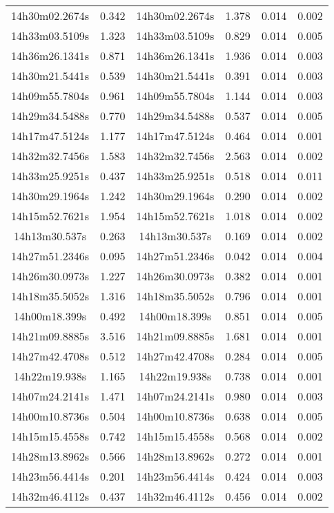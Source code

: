 \begin{table}
\begin{tabular}{cccccc}
14h30m02.2674s & 0.342 & 14h30m02.2674s & 1.378 & 0.014 & 0.002 \\
14h33m03.5109s & 1.323 & 14h33m03.5109s & 0.829 & 0.014 & 0.005 \\
14h36m26.1341s & 0.871 & 14h36m26.1341s & 1.936 & 0.014 & 0.003 \\
14h30m21.5441s & 0.539 & 14h30m21.5441s & 0.391 & 0.014 & 0.003 \\
14h09m55.7804s & 0.961 & 14h09m55.7804s & 1.144 & 0.014 & 0.003 \\
14h29m34.5488s & 0.770 & 14h29m34.5488s & 0.537 & 0.014 & 0.005 \\
14h17m47.5124s & 1.177 & 14h17m47.5124s & 0.464 & 0.014 & 0.001 \\
14h32m32.7456s & 1.583 & 14h32m32.7456s & 2.563 & 0.014 & 0.002 \\
14h33m25.9251s & 0.437 & 14h33m25.9251s & 0.518 & 0.014 & 0.011 \\
14h30m29.1964s & 1.242 & 14h30m29.1964s & 0.290 & 0.014 & 0.002 \\
14h15m52.7621s & 1.954 & 14h15m52.7621s & 1.018 & 0.014 & 0.002 \\
14h13m30.537s & 0.263 & 14h13m30.537s & 0.169 & 0.014 & 0.002 \\
14h27m51.2346s & 0.095 & 14h27m51.2346s & 0.042 & 0.014 & 0.004 \\
14h26m30.0973s & 1.227 & 14h26m30.0973s & 0.382 & 0.014 & 0.001 \\
14h18m35.5052s & 1.316 & 14h18m35.5052s & 0.796 & 0.014 & 0.001 \\
14h00m18.399s & 0.492 & 14h00m18.399s & 0.851 & 0.014 & 0.005 \\
14h21m09.8885s & 3.516 & 14h21m09.8885s & 1.681 & 0.014 & 0.001 \\
14h27m42.4708s & 0.512 & 14h27m42.4708s & 0.284 & 0.014 & 0.005 \\
14h22m19.938s & 1.165 & 14h22m19.938s & 0.738 & 0.014 & 0.001 \\
14h07m24.2141s & 1.471 & 14h07m24.2141s & 0.980 & 0.014 & 0.003 \\
14h00m10.8736s & 0.504 & 14h00m10.8736s & 0.638 & 0.014 & 0.005 \\
14h15m15.4558s & 0.742 & 14h15m15.4558s & 0.568 & 0.014 & 0.002 \\
14h28m13.8962s & 0.566 & 14h28m13.8962s & 0.272 & 0.014 & 0.001 \\
14h23m56.4414s & 0.201 & 14h23m56.4414s & 0.424 & 0.014 & 0.003 \\
14h32m46.4112s & 0.437 & 14h32m46.4112s & 0.456 & 0.014 & 0.002 \\

\end{tabular}
\end{table}
